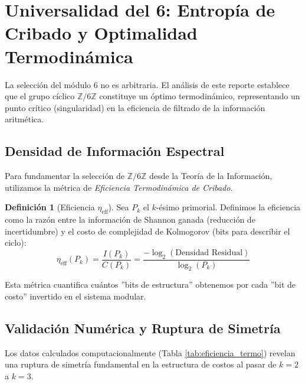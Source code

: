 \documentclass[12pt, a4paper]{article}
\theoremstyle{plain}
\theoremstyle{definition}
\newtheorem{definicion}[teorema]{Definición}
\newcommand{\Z}{\mathbb{Z}}
\begin{document}
\section{Universalidad del 6: Entropía de Cribado y Optimalidad Termodinámica}

La selección del módulo 6 no es arbitraria. El análisis de este reporte establece que el grupo cíclico $\Z/6\Z$ constituye un óptimo termodinámico, representando un punto crítico (singularidad) en la eficiencia de filtrado de la información aritmética.

\subsection{Densidad de Información Espectral}

Para fundamentar la selección de $\Z/6\Z$ desde la Teoría de la Información, utilizamos la métrica de \emph{Eficiencia Termodinámica de Cribado}. 

\begin{definicion}[Eficiencia $\eta_{\text{eff}}$]
Sea $P_k$ el $k$-ésimo primorial. Definimos la eficiencia como la razón entre la información de Shannon ganada (reducción de incertidumbre) y el costo de complejidad de Kolmogorov (bits para describir el ciclo):
\begin{equation}
    \eta_{\text{eff}}(P_k) = \frac{I(P_k)}{C(P_k)} = \frac{-\log_2(\text{Densidad Residual})}{\log_2(P_k)}
\end{equation}
\end{definicion}

Esta métrica cuantifica cuántos ''bits de estructura'' obtenemos por cada ''bit de costo'' invertido en el sistema modular.

\subsection{Validación Numérica y Ruptura de Simetría}

Los datos calculados computacionalmente (Tabla \ref{tab:eficiencia_termo}) revelan una ruptura de simetría fundamental en la estructura de costos al pasar de $k=2$ a $k=3$.
\end{document}
